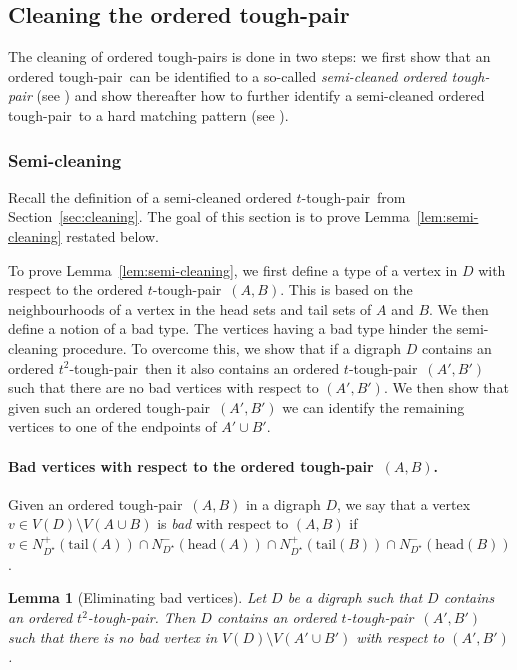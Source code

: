 \documentclass[a4paper,11pt]{article}
\theoremstyle{plain}
\newtheorem{lemma}[theorem]{Lemma}
\newtheorem{identification rule}{Identification Rule}
\theoremstyle{definition}
\theoremstyle{remark}
\newcommand{\toughpair}{tough-pair}
\newcommand{\head}{\text{head}}
\newcommand{\tail}{\text{tail}}
\begin{document}
\subsection{Cleaning the ordered \toughpair}
\label{sec:cleaningordered}

The cleaning of ordered \toughpair s is done in two steps:
we first show that an ordered \toughpair\ can be identified to a so-called \emph{semi-cleaned ordered \toughpair} (see ) and show thereafter how to further identify a semi-cleaned ordered \toughpair\ to a hard matching pattern (see ).

\subsubsection{Semi-cleaning}
\label{sec:semicleaning}

Recall the definition of a semi-cleaned ordered $t$-\toughpair\ from Section~\ref{sec:cleaning}.
The goal of this section is to prove Lemma~\ref{lem:semi-cleaning} restated below.

\semicleaning*

To prove Lemma~\ref{lem:semi-cleaning}, we first define a type of a vertex in $D$ with respect to the ordered $t$-\toughpair\ $(A,B)$. This is based on the neighbourhoods of a vertex in the head sets and tail sets of $A$ and $B$. We then define a notion of a bad type. The vertices having a bad type hinder the semi-cleaning procedure. To overcome this,
we show that if a digraph $D$ contains an ordered $t^2$-\toughpair\ then it also contains an ordered $t$-\toughpair\ $(A',B')$ such that there are no bad vertices with respect to $(A',B')$. We then show that given such an ordered \toughpair\ $(A',B')$ we can identify the remaining vertices to one of the endpoints of $A' \cup B'$.

\paragraph*{Bad vertices with respect to the ordered \toughpair\ $(A,B)$.}
Given an ordered \toughpair\ $(A,B)$ in a digraph $D$,
we say that a vertex $v \in V(D) \setminus V(A\cup B)$ is {\em bad} with respect to $(A,B)$ if $v \in N^+_{D^{\star}}(\tail(A)) \cap N^-_{D^{\star}}(\head(A)) \cap N^+_{D^{\star}}(\tail(B)) \cap N^-_{D^{\star}}(\head(B))$. 

\begin{lemma}[Eliminating bad vertices]\label{lem:badvertices}
Let $D$ be a
digraph such that $D$ contains an ordered $t^2$-\toughpair. Then $D$ contains an ordered $t$-\toughpair\ $(A',B')$ such that there is no bad vertex in $V(D) \setminus V(A' \cup B')$ with respect to $(A',B')$.
\end{lemma}
\end{document}
